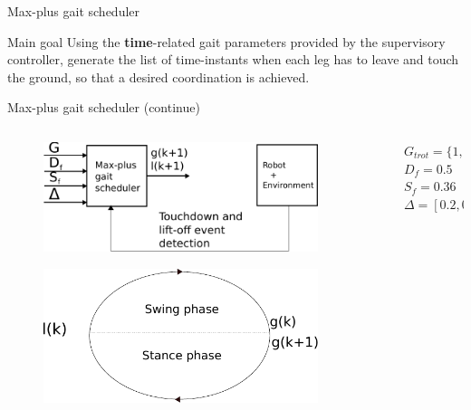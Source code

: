 \documentclass{beamer}
\begin{document}
\begin{frame}{Max-plus gait scheduler}
	\begin{block}{Main goal}
		\Large Using the \textbf{time}-related gait parameters provided by the supervisory controller, generate the list of time-instants when each leg has to leave and touch the ground, so that a desired coordination is achieved.
	\end{block}
\end{frame}

\begin{frame}{Max-plus gait scheduler (continue)}
\begin{columns}
\hspace{1cm}
\begin{column}{0.5\textwidth}
	\begin{figure}[ht]\centering
		\includegraphics[width=0.9\textwidth]{images/MaxPlus.pdf}
	\end{figure}
	\begin{figure}[ht]\centering
		\includegraphics[width=0.9\textwidth]{images/Phases.pdf}
	\end{figure}
\end{column}
\begin{column}{0.5\textwidth}
$G_{trot}=\{1,4\}\prec\{2,3\}$ \\
$D_f = 0.5$ \\
$S_f = 0.36$ \\
$\Delta = [0.2,0.2]$ 


\end{column}
\end{columns}
\end{frame}
\end{document}
